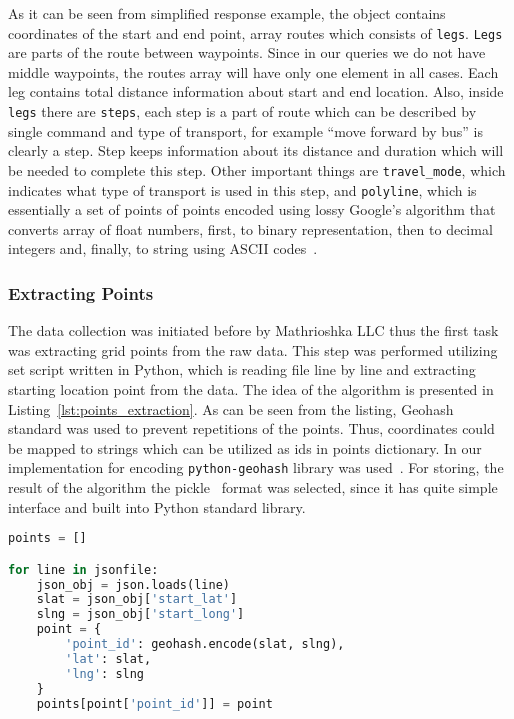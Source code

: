 As it can be seen from simplified response example, the object contains coordinates of the start and
end point, array routes which consists of \texttt{legs}. \texttt{Legs} are parts of the route
between waypoints. Since in our queries we do not have middle waypoints, the routes array will have
only one element in all cases. Each leg contains total distance information about start and end
location. Also, inside \texttt{legs} there are \texttt{steps}, each step is a part of route which can
be described by single command and type of transport, for example ``move forward by bus'' is clearly
a step. Step keeps information about its distance and duration which will be needed to complete this
step. Other important things are \texttt{travel\_mode}, which indicates what type of transport is
used in this step, and \texttt{polyline}, which is essentially a set of points of points encoded using
lossy Google's algorithm that converts array of float numbers, first, to binary representation, then
to decimal integers and, finally, to string using ASCII codes~\cite{google:polyline}.

\subsubsection{Extracting Points}

The data collection was initiated before by Mathrioshka LLC thus the first task was extracting
grid points from the raw data. This step was performed utilizing set script written in Python, which
is reading file line by line and extracting starting location point from the data. The
idea of the algorithm is presented in Listing~\ref{lst:points_extraction}. As can be seen from
the listing, Geohash~\cite{wiki:geohash} standard was used to prevent repetitions of the points.
Thus, coordinates could be mapped to strings which can be utilized as ids in points dictionary.
In our implementation for encoding \lstinline{python-geohash} library was used~\cite{pip:geohash}.
For storing, the result of the algorithm the pickle~\cite{pickle} format was selected, since it has
quite simple interface and built into Python standard library.

\begin{lstlisting}[language=python, caption=Points extraction, label={lst:points_extraction}]
points = []

for line in jsonfile:
    json_obj = json.loads(line)
    slat = json_obj['start_lat']
    slng = json_obj['start_long']
    point = {
        'point_id': geohash.encode(slat, slng),
        'lat': slat,
        'lng': slng
    }
    points[point['point_id']] = point
\end{lstlisting}

